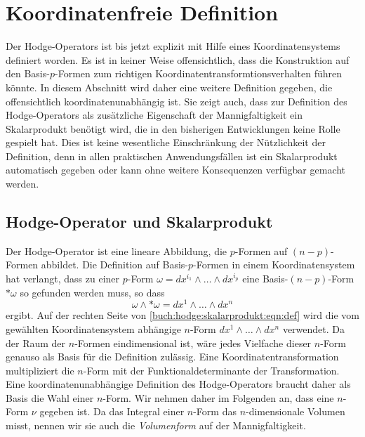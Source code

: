 %
%
%
\section{Koordinatenfreie Definition
\label{buch:hodge:section:koordinatenfrei}}
Der Hodge-Operators ist bis jetzt explizit mit Hilfe eines
Koordinatensystems definiert worden.
Es ist in keiner Weise offensichtlich, dass die Konstruktion auf
den Basis-$p$-Formen zum richtigen Koordinatentransformtionsverhalten führen
könnte.
In diesem Abschnitt wird daher eine weitere Definition gegeben,
die offensichtlich koordinatenunabhängig ist.
Sie zeigt auch, dass zur Definition des Hodge-Operators als
zusätzliche Eigenschaft der Mannigfaltigkeit ein Skalarprodukt
benötigt wird, die in den bisherigen Entwicklungen keine Rolle
gespielt hat.
Dies ist keine wesentliche Einschränkung der Nützlichkeit der
Definition, denn in allen praktischen Anwendungsfällen ist ein
Skalarprodukt automatisch gegeben oder kann ohne weitere Konsequenzen
verfügbar gemacht werden.

%
%
\subsection{Hodge-Operator und Skalarprodukt
\label{buch:hodge:koordinatenfrei:subsection:skalarprodukt}}
Der Hodge-Operator ist eine lineare Abbildung, die 
$p$-Formen auf $(n-p)$-Formen abbildet.
Die Definition auf Basis-$p$-Formen in einem Koordinatensystem
hat verlangt, dass zu einer $p$-Form $\omega=dx^{i_1}\wedge\dots\wedge dx^{i_p}$
eine Basis-$(n-p)$-Form $\ast\omega$ so gefunden werden muss, so dass
\begin{equation}
\omega\wedge {\ast\omega}
=
dx^1\wedge\dots\wedge dx^n
\label{buch:hodge:skalarprodukt:eqn:def}
\end{equation}
ergibt.
Auf der rechten Seite von \eqref{buch:hodge:skalarprodukt:eqn:def}
wird die vom gewählten Koordinatensystem abhängige $n$-Form
$dx^1\wedge\dots\wedge dx^n$ verwendet.
Da der Raum der $n$-Formen eindimensional ist, wäre jedes Vielfache
dieser $n$-Form genauso als Basis für die Definition zulässig.
Eine Koordinatentransformation multipliziert die $n$-Form mit der
Funktionaldeterminante der Transformation.
Eine koordinatenunabhängige Definition des Hodge-Operators braucht
daher als Basis die Wahl einer $n$-Form.
Wir nehmen daher im Folgenden an, dass eine $n$-Form $\nu$ gegeben
ist.
Da das Integral einer $n$-Form das $n$-dimensionale Volumen misst,
nennen wir sie auch die {\em Volumenform} auf der Mannigfaltigkeit.

